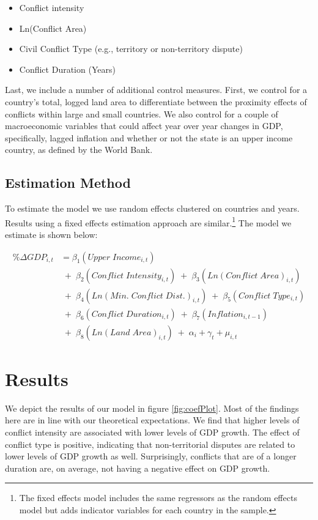 \begin{itemize}
	\item Conflict intensity
	\item Ln(Conflict Area)
	\item Civil Conflict Type (e.g., territory or non-territory dispute)
	\item Conflict Duration (Years)
\end{itemize}

Last, we include a number of additional control measures. First, we control for a country's total, logged land area to differentiate between the proximity effects of conflicts within large and small countries. We also control for a couple of macroeconomic variables that could affect year over year changes in GDP, specifically, lagged inflation and whether or not the state is an upper income country, as defined by the World Bank.

\subsection{Estimation Method}

To estimate the model we use random effects clustered on countries and years. Results using a fixed effects estimation approach are similar.\footnote{The fixed effects model includes the same regressors as the random effects model but adds indicator variables for each country in the sample.}  The model we estimate is shown below:

\begin{align*}
	\% \Delta GDP_{i,t} &= \beta_{1}(Upper \; Income_{i,t}) \\
	& \;+\; \beta_{2}(Conflict \; Intensity_{i,t}) \;+\; \beta_{3}(Ln(Conflict \; Area)_{i,t}) \\
	& \;+\; \beta_{4}(Ln(Min. \; Conflict \; Dist.)_{i,t}) \;+\; \beta_{5}(Conflict \; Type_{i,t}) \\
	& \;+\; \beta_{6}(Conflict \; Duration_{i,t}) \;+\; \beta_{7}(Inflation_{i,t-1}) \\
	& \;+\; \beta_{8}(Ln(Land \; Area)_{i,t}) \;+\; \alpha_{i} + \gamma_{t} + \mu_{i,t}
\end{align*}

\section{Results}
\label{findings} 

We depict the results of our model in figure \ref{fig:coefPlot}. Most of the findings here are in line with our theoretical expectations. We find that higher levels of conflict intensity are associated with lower levels of GDP growth. The effect of conflict type is positive, indicating that non-territorial disputes are related to lower levels of GDP growth as well. Surprisingly, conflicts that are of a longer duration are, on average, not having a negative effect on GDP growth. 

